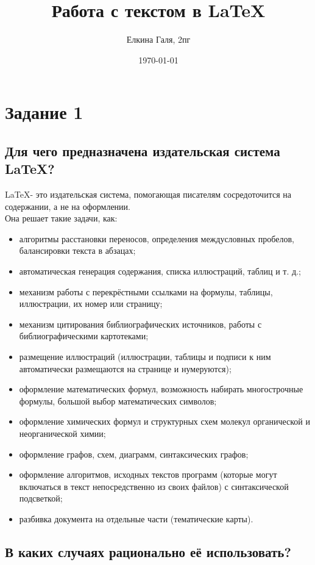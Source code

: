 \documentclass[a4paper,12pt]{article}
\author{Елкина Галя, 2пг}
\title{Работа с текстом в \LaTeX{}}
\date{\today}
\begin{document}
\maketitle
\newpage

\section*{Задание 1}

\subsection*{Для чего предназначена издательская система LaTeX?}

\LaTeX - это издательская система, помогающая писателям сосредоточится на содержании, а не на оформлении.\\
Она решает такие задачи, как:

\begin{itemize}
\item алгоритмы расстановки переносов, определения междусловных пробелов, балансировки текста в абзацах;
\item автоматическая генерация содержания, списка иллюстраций, таблиц и т. д.;
\item механизм работы с перекрёстными ссылками на формулы, таблицы, иллюстрации, их номер или страницу;
\item механизм цитирования библиографических источников, работы с библиографическими картотеками;
\item размещение иллюстраций (иллюстрации, таблицы и подписи к ним автоматически размещаются на странице и нумеруются);
\item оформление математических формул, возможность набирать многострочные формулы, большой выбор математических символов;
\item оформление химических формул и структурных схем молекул органической и неорганической химии;
\item оформление графов, схем, диаграмм, синтаксических графов;
\item оформление алгоритмов, исходных текстов программ (которые могут включаться в текст непосредственно из своих файлов) с синтаксической подсветкой;
\item разбивка документа на отдельные части (тематические карты).
\end{itemize}

\subsection*{В каких случаях рационально её использовать?}
\end{document}
